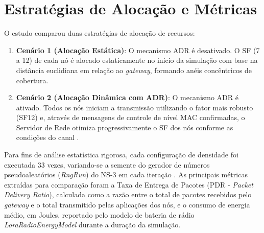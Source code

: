 \section{Estratégias de Alocação e Métricas}

O estudo comparou duas estratégias de alocação de recursos:
\begin{enumerate}
    \item \textbf{Cenário 1 (Alocação Estática)}: O mecanismo ADR é desativado. O SF (7 a 12) de cada nó é alocado estaticamente no início da simulação com base na distância euclidiana em relação ao \textit{gateway}, formando anéis concêntricos de cobertura.
    \item \textbf{Cenário 2 (Alocação Dinâmica com ADR)}: O mecanismo ADR é ativado. Todos os nós iniciam a transmissão utilizando o fator mais robusto (SF12) e, através de mensagens de controle de nível MAC confirmadas, o Servidor de Rede otimiza progressivamente o SF dos nós conforme as condições do canal \cite{VanAbeele2017}.
\end{enumerate}

Para fins de análise estatística rigorosa, cada configuração de densidade foi executada 33 vezes, variando-se a semente do gerador de números pseudoaleatórios (\textit{RngRun}) do NS-3 em cada iteração \cite{Jain1991}. As principais métricas extraídas para comparação foram a Taxa de Entrega de Pacotes (PDR - \textit{Packet Delivery Ratio}), calculada como a razão entre o total de pacotes recebidos pelo \textit{gateway} e o total transmitido pelas aplicações dos nós, e o consumo de energia médio, em Joules, reportado pelo modelo de bateria de rádio \textit{LoraRadioEnergyModel} durante a duração da simulação.